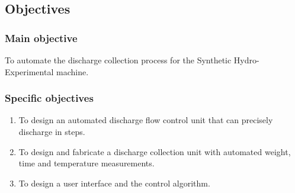\subsection{Objectives}
\subsubsection{Main objective}

 To automate the discharge collection process for the Synthetic Hydro-Experimental machine. 

\subsubsection{Specific objectives}

\begin{enumerate}
	\item To design an automated discharge flow control unit that can precisely discharge in steps.
	\item To design and fabricate a discharge collection unit with automated weight, time and temperature measurements.
    \item To design a user interface and the control algorithm.

\end{enumerate}

